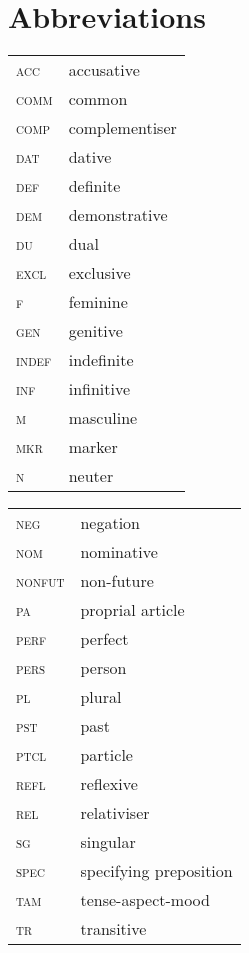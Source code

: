 \documentclass[output=paper,colorlinks,citecolor=brown]{langscibook}
\begin{document}
\section*{Abbreviations}
\begin{tabularx}{.5\textwidth}{@{}lQ@{}}
\textsc{acc} & accusative\\
\textsc{comm} & common\\
\textsc{comp} & complementiser\\
\textsc{dat} & {dative} \\
\textsc{def} & definite\\
\textsc{dem} & {demonstrative}\\
\textsc{du} & {dual}\\
\textsc{excl} & exclusive\\
\textsc{f} & feminine\\
\textsc{gen} & {genitive}\\
\textsc{indef} & {indefinite}\\
\textsc{inf} & infinitive\\
\textsc{m} & masculine\\
\textsc{mkr} & marker\\
\textsc{n} & neuter\\
\end{tabularx}%
\begin{tabularx}{.5\textwidth}{@{}lQ@{}}
\textsc{neg} & negation\\
\textsc{nom} & {nominative}\\
\textsc{nonfut} & non-future\\
\textsc{pa} & proprial {article} \\
\textsc{perf} & perfect\\
\textsc{pers} & person\\
\textsc{pl} & plural\\
\textsc{pst} & past\\
\textsc{ptcl} & particle\\
\textsc{refl} & reflexive\\
\textsc{rel} & relativiser\\
\textsc{sg} & singular\\
\textsc{spec} & specifying preposition\\
\textsc{tam} & tense-aspect-mood\\
\textsc{tr} & transitive\\
\end{tabularx}



\end{document}
